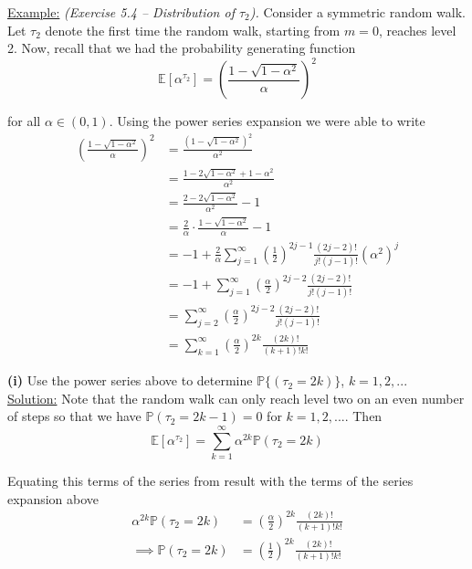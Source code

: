 \documentclass[12pt]{article}
\renewcommand{\P}{\mathbb P}
\newcommand{\E}{\mathbb E}
\begin{document}
\underline{Example:} {\em  (Exercise 5.4 -- Distribution of $\tau_2$).} Consider a symmetric random walk. Let $\tau_2$ denote the first time the random walk, starting from $m = 0$, reaches level 2. Now, recall that we had the probability generating function
\begin{equation*}
	\E[\alpha^{\tau_2}] = \left( \frac{1 - \sqrt{1 - \alpha^2}}{ \alpha } \right)^2
\end{equation*}

for all $\alpha \in (0,1)$. Using the power series expansion we were able to write
\begin{align*}
	\left( \frac{1 - \sqrt{1 - \alpha^2}}{ \alpha } \right)^2 &= \frac{ (1 - \sqrt{1 - \alpha^2})^2 }{ \alpha^2 } \\
	&= \frac{ 1 - 2\sqrt{1 - \alpha^2} + 1 - \alpha^2 }{ \alpha^2 } \\
	&= \frac{ 2 - 2\sqrt{1 - \alpha^2} }{ \alpha^2 } - 1 \\
	&= \frac{2}{\alpha} \cdot \frac{1 - \sqrt{1 - \alpha^2}}{\alpha} - 1 \\
	&= -1 + \frac{2}{\alpha} \sum^\infty_{j = 1} \left( \frac{1}{2} \right)^{2j - 1} \frac{(2j - 2)!}{j!(j - 1)!} \left(\alpha^2\right)^j \\
	&= -1 + \sum^\infty_{j = 1} \left( \frac{\alpha}{2} \right)^{2j - 2} \frac{(2j - 2)!}{j!(j - 1)!} \\
	&= \sum^\infty_{j = 2} \left( \frac{\alpha}{2} \right)^{2j - 2} \frac{(2j - 2)!}{j!(j - 1)!} \\
	&= \sum^\infty_{k = 1} \left(\frac{\alpha}{2}\right)^{2k} \frac{(2k)!}{(k + 1)!k!} 
\end{align*}

{\bf (i)} Use the power series above to determine $\P\{(\tau_2 = 2k)\}$, $k = 1,2,...$ \\

\underline{Solution:} Note that the random walk can only reach level two on an even number of steps so that we have $\P(\tau_2 = 2k - 1) = 0$ for $k = 1,2,...$. Then
\begin{equation*}
	\E[\alpha^{\tau_2}] = \sum^\infty_{k = 1} \alpha^{2k} \P(\tau_2 = 2k)
\end{equation*}

Equating this terms of the series from result with the terms of the series expansion above
\begin{align*}
	\alpha^{2k} \P(\tau_2 = 2k) &= \left(\frac{\alpha}{2}\right)^{2k} \frac{(2k)!}{(k + 1)!k!} \\
\implies \P(\tau_2 = 2k) &= \left(\frac{1}{2}\right)^{2k} \frac{(2k)!}{(k + 1)!k!}
\end{align*}
\end{document}
